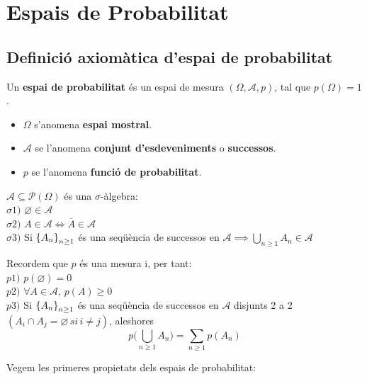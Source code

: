 \section{Espais de Probabilitat}

\subsection{Definició axiomàtica d'espai de probabilitat}

\begin{defi}
  Un \textbf{espai de probabilitat} és un espai de mesura $(\Omega, \mathcal{A}, p)$, tal que 
  $p(\Omega) = 1$.
  \begin{itemize}
      \item $\Omega$ s'anomena \textbf{espai mostral}.
      \item $\mathcal{A}$ se l'anomena \textbf{conjunt d'esdeveniments} o \textbf{successos}.
      \item $p$ se l'anomena \textbf{funció de probabilitat}.
  \end{itemize}
\end{defi}

\begin{obs}
  $\mathcal{A} \subseteq \mathcal{P}(\Omega)$ és una $\sigma$-àlgebra: \\
  $\sigma1)$ $\varnothing \in \mathcal{A}$ \\
  $\sigma2)$ $A \in \mathcal{A} \iff \overline{A} \in \mathcal{A}$ \\
  $\sigma3)$ Si $\left\{A_{n}\right\}_{n\geq1}$ és una seqüència de successos en $\mathcal{A} \implies 
  \bigcup\limits_{n\geq1}A_{n} \in \mathcal{A}$
\end{obs}

\begin{obs}
  Recordem que $p$ és una mesura i, per tant: \\
  $p1)$ $p(\varnothing) = 0$ \\
  $p2)$ $\forall A \in \mathcal{A},\, p(A)\geq0$ \\
  $p3)$ Si $\left\{A_{n}\right\}_{n\geq1}$ és una seqüència de successos en $\mathcal{A}$ disjunts 2 a 2 
  $(A_{i}\cap A_{j} = \varnothing \, si \, i \not =j)$, aleshores 
  \[
    p\bigg(\bigcup\limits_{n\geq1}A_{n}\bigg) = \sum_{n\geq1}p(A_{n})
  \]
\end{obs}

Vegem les primeres propietats dels espais de probabilitat:

